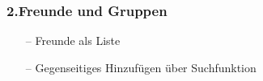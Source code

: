 \documentclass[aspectratio=1610]{beamer}
\begin{document}
	\begin{frame}[plain]
	\frametitle{2.Freunde und Gruppen}
	\begin{minipage}{0.5\textwidth}
	\setlength{\fboxsep}{0pt}%
	\setlength{\fboxrule}{1pt}%
	\captionsetup{labelformat=empty}
	\centering
	\end{minipage}%
	\begin{minipage}{0.5\textwidth}
		\begin{itemize}
			\setlength\itemsep{0.3em}
			\item[--] Freunde als Liste
			\item[--]	Gegenseitiges Hinzufügen über Suchfunktion
		\end{itemize}
	\end{minipage}%
	\end{frame}
\end{document}
